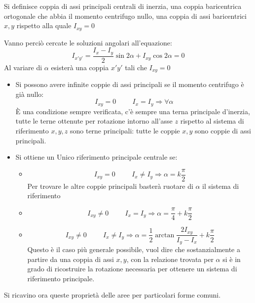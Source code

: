\documentclass{article}
\begin{document}
\begin{adjustwidth}{2in}{}
	Si definisce coppia di assi principali centrali di inerzia, una coppia baricentrica ortogonale che abbia il
	momento centrifugo nullo, una coppia di assi baricentrici $x,y$ rispetto alla quale $I_{xy}=0$\newline
	
	Vanno perciò cercate le soluzioni angolari all’equazione:
	\[ I_{x'y'} = \dfrac{I_x - I_y}{2}\sin2\alpha + I_{xy}\cos2\alpha = 0 \]
	Al variare di $\alpha$ esisterà una coppia $x'y'$ tali che $I_{xy}=0$ \newline
	
	\begin{itemize}
		\item Si possono avere infinite coppie di assi principali se il momento centrifugo è già nullo:
	\[ I_{xy} = 0 \hspace{1cm} I_x = I_y \Rightarrow \forall \alpha\]
	È una condizione sempre verificata, c'è sempre una terna principale d'inerzia, tutte le terne ottenute per rotazione intorno all'asse $z$ rispetto al sistema di riferimento $x,y,z$ sono terne principali: tutte le coppie $x,y$ sono coppie di assi principali. 
	
	\item Si ottiene un Unico riferimento principale centrale se:
	\begin{itemize}
	\item	\[ I_{xy} = 0 \hspace{1cm} I_x \ne I_y \Rightarrow  \alpha = k\dfrac{\pi}{2}\]
	Per trovare le altre coppie principali basterà ruotare di $\alpha$ il sistema di riferimento 
	
	\item\[ I_{xy} \ne 0 \hspace{1cm} I_x = I_y \Rightarrow  \alpha = \dfrac{\pi}{4} + k\dfrac{\pi}{2}\]
	
	\item \[ 
	I_{xy} \ne 0 \hspace{1cm} I_x \ne I_y \Rightarrow  \alpha = \dfrac{1}{2}\arctan\dfrac{2I_{xy}}{I_y - I_x} + k\dfrac{\pi}{2} 
	\]
	Questo è il caso più generale possibile, vuol dire che sostanzialmente  a partire da una coppia di assi $x,y$, con la relazione trovata per $\alpha$ si è in grado di ricostruire la rotazione necessaria per ottenere un sistema di riferimento principale. 
	\end{itemize}
	\end{itemize}

	Si ricavino ora queste proprietà delle aree per particolari forme comuni. \newline


\end{adjustwidth}
\end{document}
